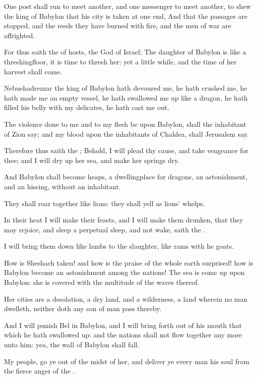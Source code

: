 \Verse One post shall run to meet another, and one messenger to meet another, to shew the king of Babylon that his city is taken at one end, \Verse And that the passages are stopped, and the reeds they have burned with fire, and the men of war are affrighted.

\Verse For thus saith the \LORD of hosts, the God of Israel; The daughter of Babylon is like a threshingfloor, it is time to thresh her: yet a little while, and the time of her harvest shall come.

\Verse Nebuchadrezzar the king of Babylon hath devoured me, he hath crushed me, he hath made me an empty vessel, he hath swallowed me up like a dragon, he hath filled his belly with my delicates, he hath cast me out.

\Verse The violence done to me and to my flesh be upon Babylon, shall the inhabitant of Zion say; and my blood upon the inhabitants of Chaldea, shall Jerusalem say.

\Verse Therefore thus saith the \LORD; Behold, I will plead thy cause, and take vengeance for thee; and I will dry up her sea, and make her springs dry.

\Verse And Babylon shall become heaps, a dwellingplace for dragons, an astonishment, and an hissing, without an inhabitant.

\Verse They shall roar together like lions: they shall yell as lions' whelps.

\Verse In their heat I will make their feasts, and I will make them drunken, that they may rejoice, and sleep a perpetual sleep, and not wake, saith the \LORD.

\Verse I will bring them down like lambs to the slaughter, like rams with he goats.

\Verse How is Sheshach taken! and how is the praise of the whole earth surprised! how is Babylon become an astonishment among the nations!  \Verse The sea is come up upon Babylon: she is covered with the multitude of the waves thereof.

\Verse Her cities are a desolation, a dry land, and a wilderness, a land wherein no man dwelleth, neither doth any son of man pass thereby.

\Verse And I will punish Bel in Babylon, and I will bring forth out of his mouth that which he hath swallowed up: and the nations shall not flow together any more unto him: yea, the wall of Babylon shall fall.

\Verse My people, go ye out of the midst of her, and deliver ye every man his soul from the fierce anger of the \LORD.

